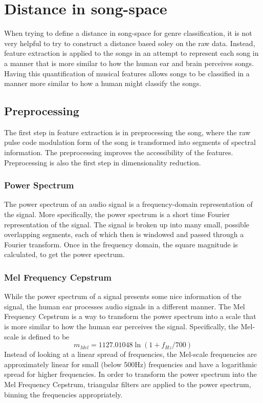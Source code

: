\documentclass[12pt]{article}
\begin{document}
\section{Distance in song-space}


When trying to define a distance in song-space for genre classification, it is not very helpful to try to construct a distance based soley on the raw data.  Instead, feature extraction is applied to the songs in an attempt to represent each song in a manner that is more similar to how the human ear and brain perceives songs.  Having this quantification of musical features allows songs to be classified in a manner more similar to how a human might classify the songs.

\subsection{Preprocessing}

The first step in feature extraction is in preprocessing the song, where the raw pulse code modulation form of the song is transformed into segments of spectral information.  The preprocessing improves the accessibility of the features.  Preprocessing is also the first step in dimensionality reduction.

\subsubsection{Power Spectrum}
The power spectrum of an audio signal is a frequency-domain representation of the signal.  More specifically, the power spectrum is a short time Fourier representation of the signal.  The signal is broken up into many small, possible overlapping segments, each of which then is windowed and passed through a Fourier transform.  Once in the frequency domain, the square magnitude is calculated, to get the power spectrum.

\subsubsection{Mel Frequency Cepstrum}
While the power spectrum of a signal presents some nice information of the signal, the human ear processes audio signals in a different manner.  The Mel Frequency Cepstrum is a way to transform the power spectrum into a scale that is more similar to how the human ear perceives the signal.  Specifically, the Mel-scale is defined to be
$$ m_{Mel} = 1127.01048 \ln(1 + f_{Hz}/700) $$
Instead of looking at a linear spread of frequencies, the Mel-scale frequencies are approximately linear for small (below 500Hz) frequencies and have a logarithmic spread for higher frequencies.  In order to transform the power spectrum into the Mel Frequency Cepstrum, triangular filters are applied to the power spectrum, binning the frequencies appropriately.
\end{document}
